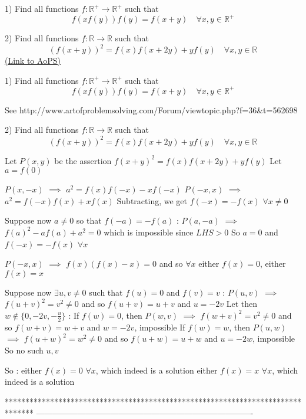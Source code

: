 \begin{problem}
	1) Find all   functions $f:\mathbb{R}^+\to\mathbb{R}^+$ such that 
\[f(xf(y))f(y)=f(x+y) \quad\forall x,y\in\mathbb{R}^+\]

2) Find all functions $f:\mathbb{R}\to\mathbb{R}$ such that 
\[\left (  f(x+y)\right )^2=f(x)f(x+2y)+yf(y) \quad\forall x,y\in\mathbb{R}\]
	\flushright \href{https://artofproblemsolving.com/community/c6h562685}{(Link to AoPS)}
\end{problem}



\begin{solution}
	\begin{tcolorbox}1) Find all   functions $f:\mathbb{R}^+\to\mathbb{R}^+$ such that 
\[f(xf(y))f(y)=f(x+y) \quad\forall x,y\in\mathbb{R}^+\]\end{tcolorbox}
See http://www.artofproblemsolving.com/Forum/viewtopic.php?f=36&t=562698
\end{solution}



\begin{solution}
	\begin{tcolorbox}2) Find all functions $f:\mathbb{R}\to\mathbb{R}$ such that 
\[\left (  f(x+y)\right )^2=f(x)f(x+2y)+yf(y) \quad\forall x,y\in\mathbb{R}\]\end{tcolorbox}
Let $P(x,y)$ be the assertion $f(x+y)^2=f(x)f(x+2y)+yf(y)$
Let $a=f(0)$

$P(x,-x)$ $\implies$ $a^2=f(x)f(-x)-xf(-x)$
$P(-x,x)$ $\implies$ $a^2=f(-x)f(x)+xf(x)$
Subtracting, we get $f(-x)=-f(x)$ $\forall x\ne 0$

Suppose now $a\ne 0$ so that $f(-a)=-f(a)$ :
$P(a,-a)$ $\implies$ $f(a)^2-af(a)+a^2=0$ which is impossible since $LHS >0$
So $a=0$ and $f(-x)=-f(x)$ $\forall x$

$P(-x,x)$ $\implies$ $f(x)(f(x)-x)=0$ and so $\forall x$ either $f(x)=0$, either $f(x)=x$

Suppose now $\exists u,v\ne 0$ such that $f(u)=0$ and $f(v)=v$ : 
$P(u,v)$ $\implies$ $f(u+v)^2=v^2\ne 0$ and so $f(u+v)=u+v$ and $u=-2v$
Let then $w\notin \{0,-2v,-\frac u2\}$ :
If $f(w)=0$, then $P(w,v)$ $\implies$ $f(w+v)^2=v^2\ne 0$ and so $f(w+v)=w+v$ and $w=-2v$, impossible
If $f(w)=w$, then $P(u,w)$ $\implies$ $f(u+w)^2=w^2\ne 0$ and so $f(u+w)=u+w$ and $u=-2w$, impossible
So no such $u,v$

So :
either $\boxed{f(x)=0}$ $\forall x$, which indeed is a solution
either $\boxed{f(x)=x}$ $\forall x$, which indeed is a solution
\end{solution}
*******************************************************************************
-------------------------------------------------------------------------------

